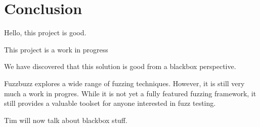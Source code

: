 \section{Conclusion}
Hello, this project is good.

This project is a work in progress

We have discovered that this solution is good from a blackbox
perspective.



Fuzzbuzz explores a wide range of fuzzing techniques. However, it is
still very much a work in progres. While it is not yet a
fully featured fuzzing framework, it still provides a valuable toolset
for anyone interested in fuzz testing.

Tim will now talk about blackbox stuff.


